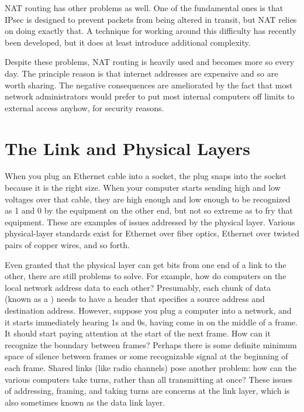 NAT routing has other problems as well.  One of the fundamental ones
is that IPsec is designed to prevent packets from being altered in
transit, but NAT relies on doing exactly that.  A technique for
working around this difficulty has recently been developed, but it
does at least introduce additional complexity.

Despite these problems, NAT routing is heavily used and becomes more
so every day.  The principle reason is that internet addresses are
expensive and so are worth sharing.  The negative consequences are
ameliorated by the fact that most network administrators would prefer to
put most internal computers off limits to external access anyhow, for
security reasons.

\section{The Link and Physical
  Layers}\label{link-physical-layers-section}

When you plug an Ethernet cable into a socket, the plug snaps into the
socket because it is the right size.  When your computer starts
sending high and low voltages over that cable, they are high enough
and low enough to be recognized as 1 and 0 by the equipment on the
other end, but not so extreme as to fry that equipment.  These are
examples of issues addressed by the physical layer.  Various physical-layer
standards exist for Ethernet over fiber optics, Ethernet over twisted
pairs of copper wires, and so forth.

Even granted that the physical layer can get bits from one end of a link to the
other, there are still problems to solve.  For example, how do
computers on the local network address data to each other?  Presumably,
each chunk of data (known as a ) needs to have a header
that specifies a source address and destination address.  However, suppose
you plug a computer into a network, and it starts immediately hearing
1s and 0s, having come in on the middle of a frame.  It should start
paying attention at the start of the next frame.  How can it recognize
the boundary between frames?  Perhaps there is some definite minimum
space of silence between frames or some recognizable signal at the
beginning of each frame.  Shared
links (like radio channels) pose another problem: how can the various
computers take turns, rather than all transmitting at once?  These
issues of addressing, framing, and taking turns are concerns at the
link layer, which is also sometimes known as the data link layer.


